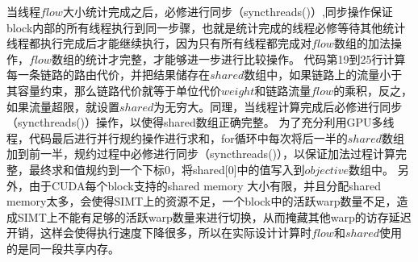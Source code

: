   当线程$flow$大小统计完成之后，必修进行同步（syncthreads()）,同步操作保证block内部的所有线程执行到同一步骤，也就是统计完成的线程必修等待其他统计线程都执行完成后才能继续执行，因为只有所有线程都完成对$flow$数组的加法操作，$flow$数组的统计才完整，才能够进一步进行比较操作。
  代码第19到25行计算每一条链路的路由代价，并把结果储存在$shared$数组中，如果链路上的流量小于其容量约束，那么链路代价就等于单位代价$weight$和链路流量$flow$的乘积，反之，如果流量超限，就设置$shared$为无穷大。同理，当线程计算完成后必修进行同步（syncthreads()）操作，以使得shared数组正确完整。	
  为了充分利用GPU多线程，代码最后进行并行规约操作进行求和，for循环中每次将后一半的$shared$数组加到前一半，规约过程中必修进行同步（syncthreads()），以保证加法过程计算完整，最终求和值规约到一个下标0，将shared[0]中的值写入到$objective$数组中。
  另外，由于CUDA每个block支持的shared memory 大小有限，并且分配shared memory太多，会使得SIMT上的资源不足，一个block中的活跃warp数量不足，造成SIMT上不能有足够的活跃warp数量来进行切换，从而掩藏其他warp的访存延迟开销，这样会使得执行速度下降很多，所以在实际设计计算时$flow$和$shared$使用的是同一段共享内存。
